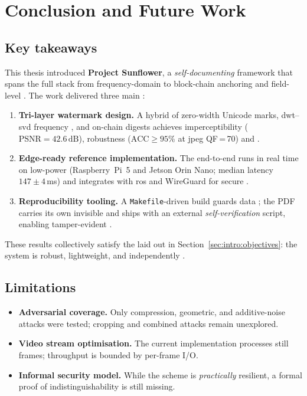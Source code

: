 \chapter{Conclusion and Future Work}
\label{ch:conclusion}

\section*{Key takeaways}

This thesis introduced \textbf{Project Sunflower}, a \emph{self-documenting} 
framework that spans the full stack from frequency-domain  to
block-chain anchoring and field-level .
The work delivered three main :

\begin{enumerate}
    \item \textbf{Tri-layer watermark design.}
    A hybrid of zero-width Unicode marks, \gls{dwt}--\gls{svd} frequency , and
    on-chain digests achieves imper\-ceptibility (\(\text{PSNR}=42.6\,\mathrm{dB}\)),
    robustness (\(\text{ACC}\ge95\%\) at \gls{jpeg} QF\,=\,70) and .
    \item \textbf{Edge-ready reference implementation.}
    The end-to-end  runs in real time on low-power 
    (Raspberry~Pi~5 and Jetson Orin Nano; median latency \(147\pm4\)\,ms) and
    integrates with \gls{ros} and WireGuard for secure .
    \item \textbf{Reproducibility tooling.}
    A \texttt{Makefile}-driven build guards data ;
    the PDF carries its own invisible  and ships with an external
    \textit{self-verification} script, enabling tamper-evident .
\end{enumerate}

These results collectively satisfy the  laid out in
Section~\ref{sec:intro:objectives}: the system is robust, lightweight,
and independently .

\section*{Limitations}

\begin{itemize}
    \item \textbf{Adversarial coverage.}  Only compression, geometric, and
    additive-noise attacks were tested; cropping and combined attacks remain
    unexplored.
    \item \textbf{Video stream optimisation.}  The current implementation
    processes still frames; throughput is bounded by per-frame I/O\@.
    \item \textbf{Informal security model.}  While the scheme is \emph{practically}
    resilient, a formal proof of indistinguishability is still missing.
\end{itemize}

